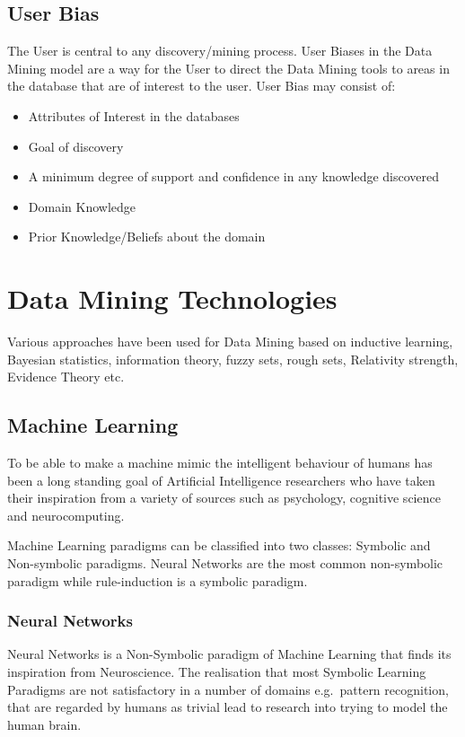 \documentclass[a4paper,12pt,notitlepage,pdftex]{scrreprt}
\begin{document}
    \section{User Bias}
        The User is central to any discovery/mining process.
        User Biases in the Data Mining model are a way for the User to direct the Data Mining tools to areas in the
        database that are of interest to the user.
        User Bias may consist of:
        \begin{itemize}
            \item Attributes of Interest in the databases
            \item Goal of discovery
            \item A minimum degree of support and confidence in any knowledge discovered
            \item Domain Knowledge
            \item Prior Knowledge/Beliefs about the domain
        \end{itemize}

\chapter{Data Mining Technologies}
    Various approaches have been used for Data Mining based on inductive learning, Bayesian statistics, information
    theory, fuzzy sets, rough sets, Relativity strength, Evidence Theory etc.

    \section{Machine Learning}
        To be able to make a machine mimic the intelligent behaviour of humans has been a long standing goal of
        Artificial Intelligence researchers who have taken their inspiration from a variety of sources such as
        psychology, cognitive science and neurocomputing.

        Machine Learning paradigms can be classified into two classes: Symbolic and Non-symbolic paradigms.
        Neural Networks are the most common non-symbolic paradigm while rule-induction is a symbolic paradigm.

        \subsection{Neural Networks}
            Neural Networks is a Non-Symbolic paradigm of Machine Learning that finds its inspiration from
            Neuroscience.
            The realisation that most Symbolic Learning Paradigms are not satisfactory in a number of domains e.g.\
            pattern recognition, that are regarded by humans as trivial lead to research into trying to model the
            human brain.
\end{document}
